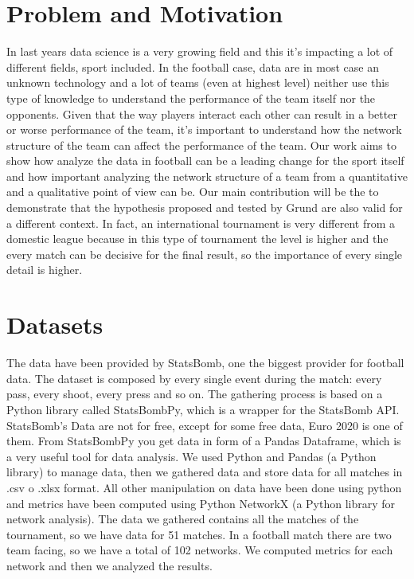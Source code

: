 \documentclass[12pt, a4paper]{article}
\begin{document}
\section{Problem and Motivation}
\label{problem-and-motivation}
In last years data science is a very growing field and this it's impacting a lot of different fields, sport included. In the football case, data are in most case an unknown technology and a lot of teams (even at highest level) neither use this type of knowledge to understand the performance of the team itself nor the opponents. Given that the way players interact each other can result in a better or worse performance of the team, it's important to understand how the network structure of the team can affect the performance of the team. Our work aims to show how analyze the data in football can be a leading change for the sport itself and how important analyzing the network structure of a team from a quantitative and a qualitative point of view can be. Our main contribution will be the  to demonstrate that the hypothesis proposed and tested by Grund \cite{GRUND} are also valid for a different context. In fact, an international tournament is very different from a domestic league because in this type of tournament the level is higher and the every match can be decisive for the final result, so the importance of every single detail is higher. 


\section{Datasets}
\label{datasets}
The data have been provided by StatsBomb, one the biggest provider for football data. The dataset is composed by every single event during the match: every pass, every shoot, every press and so on. 
The gathering process is based on a Python library called StatsBombPy, which is a wrapper for the StatsBomb API. 
StatsBomb's Data are not for free, except for some free data, Euro 2020 is one of them. From StatsBombPy you get data in form of a Pandas Dataframe, which is a very useful tool for data analysis. We used Python and Pandas (a Python library) to manage data, then we gathered data and store data for all matches in .csv o .xlsx format. All other manipulation on data have been done using python and metrics have been computed using Python  NetworkX (a Python library for network analysis). The data we gathered contains all the matches of the tournament, so we have data for 51 matches. In a football match there are two team facing, so we have a total of 102 networks. We computed metrics for each network and then we analyzed the results.
\end{document}
